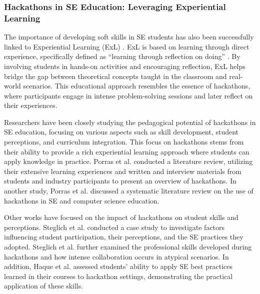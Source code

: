 

\subsubsection{Hackathons in SE Education: Leveraging Experiential Learning}
The importance of developing soft skills in SE students has also been successfully linked to Experiential Learning (ExL) \cite{fioravanti2023software}. ExL is based on learning through direct experience, specifically defined as ``learning through reflection on doing'' \cite{bradberry2019learning}. By involving students in hands-on activities and encouraging reflection, ExL helps bridge the gap between theoretical concepts taught in the classroom and real-world scenarios. This educational approach resembles the essence of hackathons, where participants engage in intense problem-solving sessions and later reflect on their experiences.

Researchers have been closely studying the pedagogical potential of hackathons in SE education, focusing on various aspects such as skill development, student perceptions, and curriculum integration. This focus on hackathons stems from their ability to provide a rich experiential learning approach where students can apply knowledge in practice. Porras et al. \cite{porras2018hackathons} conducted a literature review, utilizing their extensive learning experiences and written and interview materials from students and industry participants to present an overview of hackathons. In another study, Porras et al. \cite{porras2019code} discussed a systematic literature review on the use of hackathons in SE and computer science education. 



Other works have focused on the impact of hackathons on student skills and perceptions.  Steglich et al. \cite{steglich2020hackathons} conducted a case study to investigate factors influencing student participation, their perceptions, and the SE practices they adopted. Steglich et al. \cite{steglich2021online} further examined the professional skills developed during hackathons and how intense collaboration occurs in atypical scenarios. In addition, Haque et al. \cite{haque2022effectiveness} assessed students' ability to apply SE best practices learned in their courses to hackathon settings, demonstrating the practical application of these skills.

